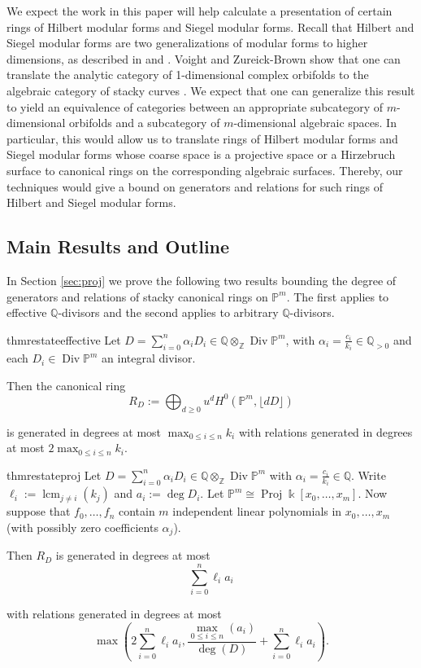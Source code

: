 \documentclass{amsart}
\theoremstyle{plain}
\theoremstyle{definition}
\theoremstyle{remark}
\numberwithin{equation}{section}
\newcommand\ssec{\subsection}
\newcommand\bq{{\mathbb Q}}
\newcommand\bp{{\mathbb P}}
\newcommand\bz{{\mathbb Z}}
\newcommand\bk{{\Bbbk}}
\DeclareMathOperator\di{Div}
\newcommand\bida{a}
\DeclareMathOperator{\proj}{Proj}
\DeclareMathOperator{\lcm}{lcm}
\begin{document}
We expect the work in this paper will help calculate a presentation of certain rings of
Hilbert 
modular forms and Siegel modular forms. Recall that Hilbert and Siegel 
modular forms are two generalizations of modular forms to higher dimensions,
as described in \cite{geer:siegel-modular} and \cite{bruinier:hilbert-modular}.
Voight and Zureick-Brown show that 
one can translate the analytic category of 1-dimensional complex orbifolds to
the algebraic category of stacky curves \cite[Proposition 6.1.5]{vzb:stacky}. 
We expect that one can generalize this result to yield an equivalence of
categories between an appropriate subcategory of $m$-dimensional orbifolds and
a subcategory of $m$-dimensional algebraic spaces.
In particular, this would allow us to translate rings of Hilbert modular forms
and Siegel modular forms whose coarse space is a projective space or a
Hirzebruch surface to canonical rings on the corresponding algebraic surfaces.
Thereby, our techniques would give a bound on generators and relations for such
rings of Hilbert and Siegel modular forms.

\ssec{Main Results and Outline}

In Section \ref{sec:proj} we prove the following two results bounding
the degree of generators and relations of
stacky canonical rings on $\bp^m$. The first applies
to effective $\bq$-divisors and the second applies to arbitrary
$\bq$-divisors.
\begin{restatable}{thm}{restateeffective}
\label{thm:proj-effective-intro}
Let $D = \sum_{i = 0}^{n} \alpha_i D_i \in \bq \otimes_\bz \di \bp^m$, with $\alpha_i =
\frac{c_i}{k_i} \in \bq_{> 0}$ and each $D_i \in \di \bp^m$ an integral divisor.

Then the canonical ring
\[
	R_D := \bigoplus_{d \geq 0} u^d H^0(\bp^m, \lfloor dD \rfloor)
\]

\noindent
is generated in degrees at most $\max_{0 \leq i \leq n}{k_i}$ with
relations generated in degrees at most $2 \max_{0 \leq i \leq n}{k_i}$.
\end{restatable}

\begin{restatable}{thm}{restateproj}
\label{thm:proj-generators-relations}
Let $D = \sum_{i=0}^n \alpha_i D_i \in \bq \otimes_\bz \di \bp^m$
with $\alpha_i = \frac{c_i}{k_i}\in \bq$. Write $\ell_i := \lcm
_{j \ne i}(k_j)$ and $a_i := \deg D_i$. Let $\bp^m \cong \proj
\bk[x_0, \ldots, x_m]$. Now suppose that $f_0, \ldots, f_n$ contain
$m$ independent linear polynomials in $x_0, \ldots, x_m$ \rm(with possibly
zero coefficients $\alpha_j$\rm).

Then $R_D$ is generated in degrees at most 
\[
	\sum_{i=0}^n \ell_i a_i
\]

\noindent
with relations generated in degrees at most
\[
	\max \left(2 \sum_{i=0}^n \ell_i a_i, \frac{\max_{0\le i \le n}
	(	\bida_i)}{\deg(D)} + \sum_{i=0}^n \ell_i a_i \right).
\]
\end{restatable}
\end{document}
